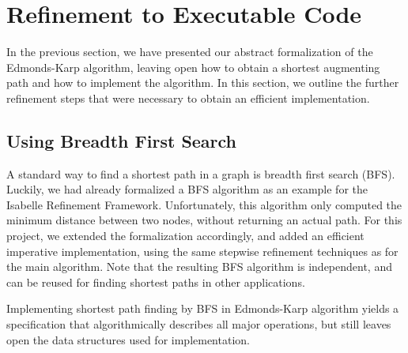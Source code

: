 \documentclass[smallcondensed]{svjour3}     %
\begin{document}
    
\section{Refinement to Executable Code}\label{sec:executable}
  In the previous section, we have presented our abstract formalization of the Edmonds-Karp algorithm,
  leaving open how to obtain a shortest augmenting path and how to implement the algorithm. 
  In this section, we outline the further refinement steps that were necessary to obtain an efficient implementation.

  \subsection{Using Breadth First Search}
  A standard way to find a shortest path in a graph is breadth first search (BFS). Luckily, we had already formalized a BFS algorithm as an example for the 
  Isabelle Refinement Framework. Unfortunately, this algorithm only computed the minimum distance between two nodes, without returning an actual path. For this project, we extended the formalization accordingly, and added an efficient imperative implementation, using the same stepwise refinement techniques as for the main algorithm. Note that the resulting BFS algorithm is independent, and can be reused for finding shortest paths in other applications. 
  
  Implementing shortest path finding by BFS in Edmonds-Karp algorithm yields a specification that algorithmically describes all major operations, but still leaves open the data structures used for implementation.
  
\end{document}
